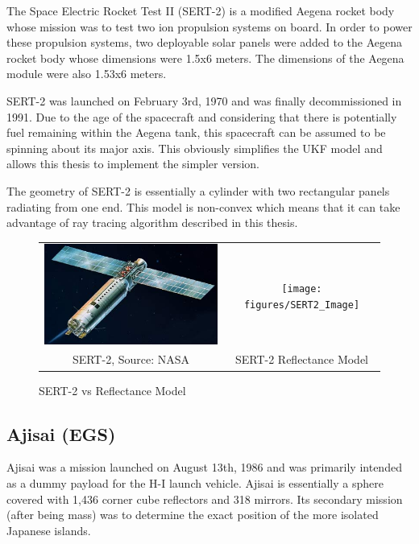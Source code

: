 The Space Electric Rocket Test II (SERT-2) is a modified Aegena rocket body whose mission was to test two ion propulsion systems on board. \cite{sert2} In order to power these propulsion systems, two deployable solar panels were added to the Aegena rocket body whose dimensions were 1.5x6 meters. The dimensions of the Aegena module were also 1.53x6 meters.

SERT-2 was launched on February 3rd, 1970 and was finally decommissioned in 1991. Due to the age of the spacecraft and considering that there is potentially fuel remaining within the Aegena tank, this spacecraft can be assumed to be spinning about its major axis. This obviously simplifies the UKF model and allows this thesis to implement the simpler version.

The geometry of SERT-2 is essentially a cylinder with two rectangular panels radiating from one end. This model is non-convex which means that it can take advantage of ray tracing algorithm described in this thesis. 

\begin{figure}
	\begin{tabular}{cc}
	\includegraphics[width = 80mm]{figures/sert-2} & \texttt{[image: figures/SERT2\_Image]} \\
	SERT-2, Source: NASA & SERT-2 Reflectance Model 
	
	\end{tabular}
	\caption{SERT-2 vs Reflectance Model}
\end{figure}


\subsection{Ajisai (EGS)}

Ajisai was a mission launched on August 13th, 1986 and was primarily intended as a dummy payload for the H-I launch vehicle. \cite{ajisai_jaxa} Ajisai is essentially a sphere covered with 1,436 corner cube reflectors and 318 mirrors. \cite{ajisai} Its secondary mission (after being mass) was to determine the exact position of the more isolated Japanese islands. \cite{ajisai_jaxa}

